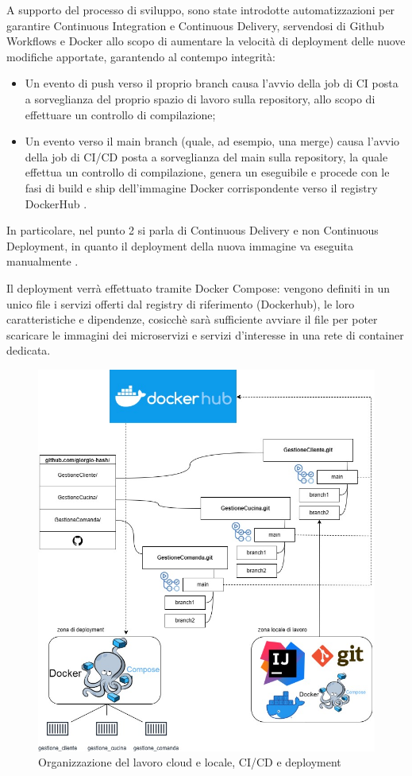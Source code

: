 A supporto del processo di sviluppo, sono state introdotte automatizzazioni per garantire Continuous Integration e Continuous Delivery, servendosi di Github Workflows e Docker allo scopo di aumentare la velocità di deployment delle nuove modifiche apportate, garantendo al contempo integrità:
\begin{itemize}
    \item Un evento di push verso il proprio branch causa l’avvio della job di CI posta a sorveglianza del proprio spazio di lavoro sulla repository, allo scopo di effettuare un controllo di compilazione;
    \item Un evento verso il main branch (quale, ad esempio, una merge) causa l’avvio della job di CI/CD posta a sorveglianza del main sulla repository, la quale effettua un controllo di compilazione, genera un eseguibile e procede con le fasi di build e ship dell'immagine Docker corrispondente verso il registry DockerHub \cite{DockerOverview}.
\end{itemize}

In particolare, nel punto 2 si parla di Continuous Delivery e non Continuous Deployment, in quanto il deployment della nuova immagine va eseguita manualmente \cite{CDDocker}.

Il deployment verrà effettuato tramite Docker Compose: vengono definiti in un unico file i servizi offerti dal registry di riferimento (Dockerhub), le loro caratteristiche e dipendenze, cosicchè sarà sufficiente avviare il file per poter scaricare le immagini dei microservizi e servizi d’interesse in una rete di container dedicata.



\begin{figure}[htbp]
	\centering
	\includegraphics[scale=0.36]{iterazione1/images/DevOps.jpg}
	\caption{Organizzazione del lavoro cloud e locale, CI/CD e deployment 
 \label{fig:devopsit1}}
\end{figure}


